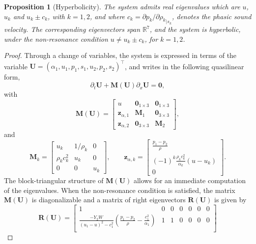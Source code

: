\documentclass{myclass}
\newtheorem{proposition}{\bf Proposition}[section]
\newcommand{\mtrx}[1]{\mathbf{#1}}
\newcommand{\pth}[1]  {\left( #1 \right)}
\begin{document}
\begin{proposition}[Hyperbolicity]\label{prop:hyperbolicity} The system admits real eigenvalues which are $u$, $u_k$ and $u_k\pm c_k$, with $k=1,2$, and where $c_k=\partial p_k/\partial{\rho_k}_{|s_k}$, denotes the phasic sound velocity. The corresponding eigenvectors span $\mathbb{R}^7$, and the system is hyperbolic, under the non-resonance condition $u\neq u_k\pm c_k$, for $k=1,2$.
\end{proposition}
\begin{proof}
Through a change of variables, the system is expressed in terms of the variable $\bm{U}=(\alpha_1,u_1,p_1,s_1,u_2,p_2,s_2)^\top$, and writes in the following quasilinear form,
\begin{equation}\label{eq:quasilinear_form}
\partial_t\bm{U} + \mtrx{M}(\bm{U})\partial_x\bm{U}=\bm{0},
\end{equation}
with
\begin{equation}
\mtrx{M}(\bm{U}) = 
\begin{bmatrix}
u & \bm{0}_{1\times3} & \bm{0}_{1\times3} \\
\bm{z}_{\alpha,1}  & \mtrx{M}_1 & \bm{0}_{3\times3}\\
\bm{z}_{\alpha,2}  & \bm{0}_{3\times3} & \mtrx{M}_2
\end{bmatrix},
\end{equation}
and
\begin{equation}
\mtrx{M}_k = \begin{bmatrix}
u_k & 1/\rho_k & 0 \\
\rho_k c_k^2 & u_k & 0\\
0 & 0 & u_k
\end{bmatrix},
\qquad 
\bm{z}_{\alpha,k} = 
\begin{bmatrix}
\tfrac{p_1-p_2}{\rho} \\ (-1)^k\tfrac{\rho_k c_k^2}{\alpha_k}(u-u_k)\\ 0
\end{bmatrix}.
\end{equation}
The block-triangular structure of $\mtrx{M}(\bm{U})$ allows for an immediate computation of the eigenvalues. When the non-resonance condition is satisfied, the matrix $\mtrx{M}(\bm{U})$ is diagonalizable and a matrix of right eigenvectors $\mtrx{R}(\bm{U})$ is given by
\begin{equation}\label{eq:eigenvectors}
\mathbf{R}(\bm{U})= 
\begin{bmatrix}
1 & 0 & 0 & 0 & 0 & 0 & 0 \\
\tfrac{-Y_2 W}{(u_1-u)^2-c_1^2}\pth{\tfrac{p_1-p_2}{\rho} - \tfrac{c_1^2}{\alpha_1}} & 1 & 1 & 0 & 0 & 0 & 0 \\

\end{bmatrix}
\end{equation}
\end{proof}
\end{document}
